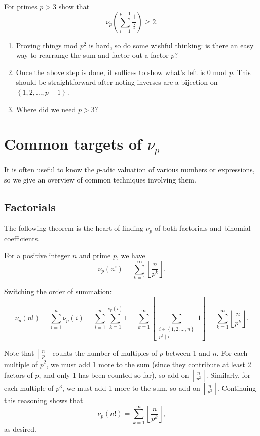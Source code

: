 \documentclass[mast]{lucky}
\begin{document}
\begin{exam}
    For primes $p>3$ show that \[\nu_p\left( \sum_{i=1}^{p-1}\frac1i \right)\geq 2.\]
\end{exam}

\begin{walk}
    \begin{enumerate}
        \item Proving things mod $p^2$ is hard, so do some wishful thinking: is there an easy way to rearrange the sum and factor out a factor $p$?
        \item Once the above step is done, it suffices to show what's left is 0 mod $p$. This should be straightforward after noting inverses are a bijection on $\left\{ 1,2,\dots,p-1 \right\}$.
        \item Where did we need $p>3$?
    \end{enumerate}
\end{walk}

\section{Common targets of $\nu_p$}
It is often useful to know the $p$-adic valuation of various numbers or expressions, so we give an overview of common techniques involving them.
\subsection{Factorials}
The following theorem is the heart of finding $\nu_p$ of both factorials and binomial coefficients.
\begin{theo}[Legendre]
    For a positive integer $n$ and prime $p$, we have \[\nu_p(n!)=\sum_{k=1}^{\infty}\left\lfloor \frac n{p^k} \right\rfloor.\]
\end{theo}

\begin{pro}[1]
    Switching the order of summation: \[\nu_p(n!)=\sum_{i=1}^n \nu_p(i)=\sum_{i=1}^n\sum_{k=1}^{\nu_p(i)}1=\sum_{k=1}^{\infty}\left[\sum_{\substack{i\in\left\{ 1,2,\dots,n \right\}\\ p^k\mid i}}1\right]=\sum_{k=1}^\infty\left\lfloor \frac n{p^k} \right\rfloor.\]
\end{pro}

\begin{pro}[2]
    Note that $\left\lfloor \frac np \right\rfloor$ counts the number of multiples of $p$ between 1 and $n$. For each multiple of $p^2$, we must add 1 more to the sum (since they contribute at least 2 factors of $p$, and only 1 has been counted so far), so add on $\left\lfloor \frac n{p^2} \right\rfloor$. Similarly, for each multiple of $p^3$, we must add 1 more to the sum, so add on $\left\lfloor \frac n{p^3} \right\rfloor$. Continuing this reasoning shows that \[\nu_p(n!)=\sum_{k=1}^{\infty}\left\lfloor \frac n{p^k} \right\rfloor,\] as desired.
\end{pro}
\end{document}
